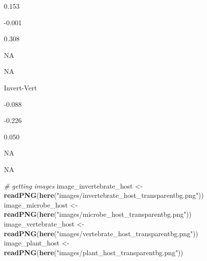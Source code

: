 \documentclass[
]{article}
\newenvironment{Shaded}{\begin{snugshade}}{\end{snugshade}}
\newcommand{\CommentTok}[1]{\textcolor[rgb]{0.56,0.35,0.01}{\textit{#1}}}
\newcommand{\KeywordTok}[1]{\textcolor[rgb]{0.13,0.29,0.53}{\textbf{#1}}}
\newcommand{\NormalTok}[1]{#1}
\newcommand{\StringTok}[1]{\textcolor[rgb]{0.31,0.60,0.02}{#1}}
\begin{document}
0.153

-0.001

0.308

NA

NA

Invert-Vert

-0.088

-0.226

0.050

NA

NA

\begin{Shaded}
\begin{Highlighting}[]
\CommentTok{# getting images}
\NormalTok{image_invertebrate_host <-}\StringTok{ }\KeywordTok{readPNG}\NormalTok{(}\KeywordTok{here}\NormalTok{(}\StringTok{"images/invertebrate_host_transparentbg.png"}\NormalTok{))}
\NormalTok{image_microbe_host <-}\StringTok{ }\KeywordTok{readPNG}\NormalTok{(}\KeywordTok{here}\NormalTok{(}\StringTok{"images/microbe_host_transparentbg.png"}\NormalTok{))}
\NormalTok{image_vertebrate_host <-}\StringTok{ }\KeywordTok{readPNG}\NormalTok{(}\KeywordTok{here}\NormalTok{(}\StringTok{"images/vertebrate_host_transparentbg.png"}\NormalTok{))}
\NormalTok{image_plant_host <-}\StringTok{ }\KeywordTok{readPNG}\NormalTok{(}\KeywordTok{here}\NormalTok{(}\StringTok{"images/plant_host_transparentbg.png"}\NormalTok{))}


\end{Highlighting}
\end{Shaded}
\end{document}
